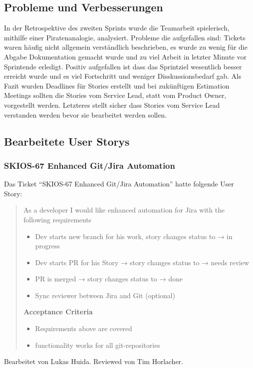 \subsection{Probleme und Verbesserungen}
In der Retrospektive des zweiten Sprints wurde die Teamarbeit spielerisch, mithilfe einer Piratenanalogie, analysiert.
Probleme die aufgefallen sind: Tickets waren häufig nicht allgemein verständlich beschrieben, es wurde zu wenig für die Abgabe Dokumentation gemacht wurde und zu viel Arbeit in letzter Minute vor Sprintende erledigt.
Positiv aufgefallen ist dass das Sprintziel wesentlich besser erreicht wurde und es viel Fortschritt und weniger Disskussionsbedarf gab.
Als Fazit wurden Deadlines für Stories erstellt und bei zukünftigen Estimation Meetings sollten die Stories vom Service Lead, statt vom Product Owner, vorgestellt werden. Letzteres stellt sicher dass Stories vom Service Lead verstanden werden bevor sie bearbeitet werden sollen. 

\subsection{Bearbeitete User Storys}

\subsubsection{SKIOS-67 Enhanced Git/Jira Automation}
Das Ticket \enquote{SKIOS-67 Enhanced Git/Jira Automation} hatte folgende User Story:
\begin{quotation}
    As a developer I would like enhanced automation for Jira with the following requirements
    \begin{itemize}
        \item Dev starts new branch for his work, story changes status to → in progress
        \item Dev starts PR for his Story → story changes status to → needs review
        \item PR is merged → story changes status to → done
        \item Sync reviewer between Jira and Git (optional) 
    \end{itemize}

    \textbf{Acceptance Criteria}
    \begin{itemize}
        \item Requirements above are covered
        \item functionality works for all git-repositories
    \end{itemize}
\end{quotation}
Bearbeitet von Lukas Huida.
Reviewed von Tim Horlacher.

